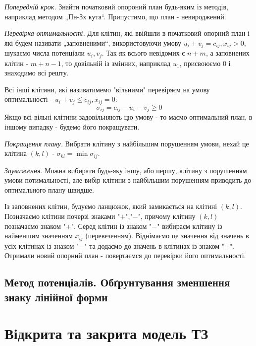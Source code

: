 \documentclass[12pt,a4paper]{book}
\newenvironment{slim_enumerate}{
\begin{enumerate}
  \setlength{\itemsep}{1pt}
  \setlength{\parskip}{0pt}
  \setlength{\parsep}{0pt}}
{\end{enumerate}}
\begin{document}
\begin{slim_enumerate}
  \item \emph{Попередній крок.} Знайти початковий опороний план будь-яким із методів, наприклад методом „Пн-Зх кута“. Припустимо, що план - невироджений.

  \item \emph{Перевірка оптимальності.} Для клітин, які ввійшли в початковий опорний план і які будем називати „заповненими“, використовуючи умову $u_i + v_j = c_{ij}, x_{ij} > 0$, шукаємо числа потенціали $u_i, v_j$. Так як всього невідомих є $n+m$, а заповнених клітин - $m+n-1$, то довільній із змінних, наприклад $u_1$, присвоюємо $0$ і знаходимо всі решту.

Всі інші клітини, які називатимемо "вільними" перевіряєм на умову оптимальності - $u_i + v_j \leq c_{ij}, x_{ij} = 0$:
\begin{equation} \sigma_{ij} = c_{ij} - u_i - v_j \geq 0\end{equation}
Якщо всі вільні клітини задовільняють цю умову - то маємо оптимальний план, в іншому випадку - будемо його покращувати.

  \item \emph{Покращення плану.} Вибрати клітину з найбільшим порушенням умови, нехай це клітина $(k,l)$ - $\sigma_{kl} = \min \sigma_{ij}$.

\emph{Зауваження.} Можна вибирати будь-яку іншу, або першу, клітину з порушенням умови потимальності, але вибір клітини з найбільшим порушенням приводить до оптимального плану швидше.

Із заповнених клітин, будуємо ланцюжок, який замикається на клітині $(k,l)$. Позначаємо клітини почерзі знаками "$+$","$-$", причому клітину $(k,l)$ позначаємо знаком "+". Серед клітин із знаком "$-$" вибираєм клітину із найменшим значенням $x_{ij}$ (перевезенням). Віднімаємо це значення від значень в усіх клітинах із знаком "$-$" та додаємо до значень в клітинах із знаком "$+$". Отримали новий опорний план - повертаємся до перевірки його оптимальності.
\end{slim_enumerate}

\subsection{Метод потенціалів. Обґрунтування зменшення знаку лінійної форми}
\section{Відкрита та закрита модель ТЗ}
\end{document}

